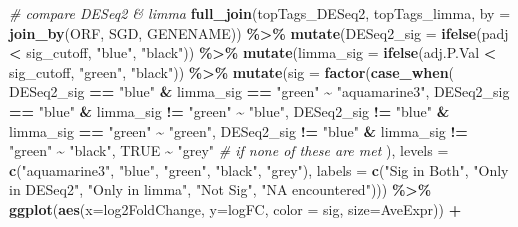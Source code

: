\documentclass[
]{book}
\newenvironment{Shaded}{\begin{snugshade}}{\end{snugshade}}
\newcommand{\AttributeTok}[1]{\textcolor[rgb]{0.13,0.29,0.53}{#1}}
\newcommand{\CommentTok}[1]{\textcolor[rgb]{0.56,0.35,0.01}{\textit{#1}}}
\newcommand{\ConstantTok}[1]{\textcolor[rgb]{0.56,0.35,0.01}{#1}}
\newcommand{\FunctionTok}[1]{\textcolor[rgb]{0.13,0.29,0.53}{\textbf{#1}}}
\newcommand{\NormalTok}[1]{#1}
\newcommand{\SpecialCharTok}[1]{\textcolor[rgb]{0.81,0.36,0.00}{\textbf{#1}}}
\newcommand{\StringTok}[1]{\textcolor[rgb]{0.31,0.60,0.02}{#1}}
\begin{document}
\begin{Shaded}
\begin{Highlighting}[]
\CommentTok{\# compare DESeq2 \& limma}
\FunctionTok{full\_join}\NormalTok{(topTags\_DESeq2, topTags\_limma,}
          \AttributeTok{by =} \FunctionTok{join\_by}\NormalTok{(ORF, SGD, GENENAME)) }\SpecialCharTok{\%\textgreater{}\%}
  \FunctionTok{mutate}\NormalTok{(}\AttributeTok{DESeq2\_sig =} \FunctionTok{ifelse}\NormalTok{(padj }\SpecialCharTok{\textless{}}\NormalTok{ sig\_cutoff, }\StringTok{"blue"}\NormalTok{, }\StringTok{"black"}\NormalTok{)) }\SpecialCharTok{\%\textgreater{}\%}
  \FunctionTok{mutate}\NormalTok{(}\AttributeTok{limma\_sig =} \FunctionTok{ifelse}\NormalTok{(adj.P.Val }\SpecialCharTok{\textless{}}\NormalTok{ sig\_cutoff, }\StringTok{"green"}\NormalTok{, }\StringTok{"black"}\NormalTok{)) }\SpecialCharTok{\%\textgreater{}\%} 
  \FunctionTok{mutate}\NormalTok{(}\AttributeTok{sig =} \FunctionTok{factor}\NormalTok{(}\FunctionTok{case\_when}\NormalTok{(}
\NormalTok{    DESeq2\_sig }\SpecialCharTok{==} \StringTok{"blue"} \SpecialCharTok{\&}\NormalTok{ limma\_sig }\SpecialCharTok{==} \StringTok{"green"} \SpecialCharTok{\textasciitilde{}} \StringTok{"aquamarine3"}\NormalTok{,}
\NormalTok{    DESeq2\_sig }\SpecialCharTok{==} \StringTok{"blue"} \SpecialCharTok{\&}\NormalTok{ limma\_sig }\SpecialCharTok{!=} \StringTok{"green"} \SpecialCharTok{\textasciitilde{}} \StringTok{"blue"}\NormalTok{,}
\NormalTok{    DESeq2\_sig }\SpecialCharTok{!=} \StringTok{"blue"} \SpecialCharTok{\&}\NormalTok{ limma\_sig }\SpecialCharTok{==} \StringTok{"green"} \SpecialCharTok{\textasciitilde{}} \StringTok{"green"}\NormalTok{,}
\NormalTok{    DESeq2\_sig }\SpecialCharTok{!=} \StringTok{"blue"} \SpecialCharTok{\&}\NormalTok{ limma\_sig }\SpecialCharTok{!=} \StringTok{"green"} \SpecialCharTok{\textasciitilde{}} \StringTok{"black"}\NormalTok{,}
    \ConstantTok{TRUE} \SpecialCharTok{\textasciitilde{}} \StringTok{"grey"}  \CommentTok{\# if none of these are met}
\NormalTok{  ), }\AttributeTok{levels =} \FunctionTok{c}\NormalTok{(}\StringTok{"aquamarine3"}\NormalTok{, }\StringTok{"blue"}\NormalTok{, }\StringTok{"green"}\NormalTok{, }\StringTok{"black"}\NormalTok{, }\StringTok{"grey"}\NormalTok{), }\AttributeTok{labels =} \FunctionTok{c}\NormalTok{(}\StringTok{"Sig in Both"}\NormalTok{, }\StringTok{"Only in DESeq2"}\NormalTok{, }\StringTok{"Only in limma"}\NormalTok{, }\StringTok{"Not Sig"}\NormalTok{, }\StringTok{"NA encountered"}\NormalTok{))) }\SpecialCharTok{\%\textgreater{}\%}
  \FunctionTok{ggplot}\NormalTok{(}\FunctionTok{aes}\NormalTok{(}\AttributeTok{x=}\NormalTok{log2FoldChange, }\AttributeTok{y=}\NormalTok{logFC, }\AttributeTok{color =}\NormalTok{ sig, }\AttributeTok{size=}\NormalTok{AveExpr)) }\SpecialCharTok{+}

\end{Highlighting}
\end{Shaded}
\end{document}
